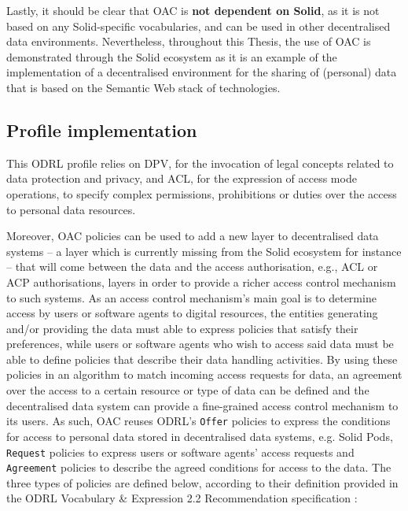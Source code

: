 
Lastly, it should be clear that OAC is \textbf{not dependent on Solid}, as it is not based on any Solid-specific vocabularies, and can be used in other decentralised data environments.
Nevertheless, throughout this Thesis, the use of OAC is demonstrated through the Solid ecosystem as it is an example of the implementation of a decentralised environment for the sharing of (personal) data that is based on the Semantic Web stack of technologies.

\subsection{Profile implementation}
\label{sec:oac_implementation}

This ODRL profile relies on DPV, for the invocation of legal concepts related to data protection and privacy, and ACL, for the expression of access mode operations, to specify complex permissions, prohibitions or duties over the access to personal data resources.

Moreover, OAC policies can be used to add a new layer to decentralised data systems -- a layer which is currently missing from the Solid ecosystem for instance -- that will come between the data and the access authorisation, e.g., ACL or ACP authorisations, layers in order to provide a richer access control mechanism to such systems.
As an access control mechanism's main goal is to determine access by users or software agents to digital resources, the entities generating and/or providing the data must able to express policies that satisfy their preferences, while users or software agents who wish to access said data must be able to define policies that describe their data handling activities. 
By using these policies in an algorithm to match incoming access requests for data, an agreement over the access to a certain resource or type of data can be defined and the decentralised data system can provide a fine-grained access control mechanism to its users.
As such, OAC reuses ODRL's \texttt{Offer} policies to express the conditions for access to personal data stored in decentralised data systems, e.g. Solid Pods, \texttt{Request} policies to express users or software agents' access requests and \texttt{Agreement} policies to describe the agreed conditions for access to the data. 
The three types of policies are defined below, according to their definition provided in the ODRL Vocabulary \& Expression 2.2 Recommendation specification \citep{iannella_odrl_vocab_2018}:

